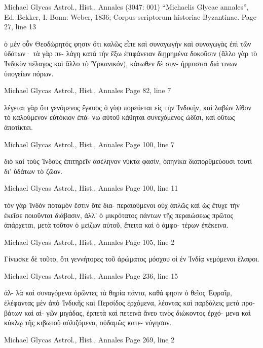 \documentclass[12pt,letterpaper,twoside,final]{memoir}
\begin{document}
\begin{greek}

Michael Glycas Astrol., Hist., Annales (3047: 001)
“Michaelis Glycae annales”, Ed. Bekker, I.
Bonn: Weber, 1836; Corpus scriptorum historiae Byzantinae.
Page 27, line 13

                ὁ μὲν οὖν Θεοδώρητός φησιν ὅτι καλῶς εἶπε 
καὶ συναγωγὴν καὶ συναγωγὰς ἐπὶ τῶν ὑδάτων· τὰ γὰρ πε-
λάγη κατὰ τὴν ἔξω ἐπιφάνειαν διῃρημένα δοκοῦσιν (ἄλλο γὰρ 
τὸ Ἰνδικὸν πέλαγος καὶ ἄλλο τὸ Ὑρκανικόν), κάτωθεν δὲ συν-
ήρμοσται διά τινων ὑπογείων πόρων. 



Michael Glycas Astrol., Hist., Annales 
Page 82, line 7

      λέγεται γὰρ ὅτι γενόμενος ἔγκυος ὁ γὺψ πορεύεται εἰς 
τὴν Ἰνδικήν, καὶ λαβὼν λίθον τὸ καλούμενον εὐτόκιον ἐπά-
νω αὐτοῦ κάθηται συνεχόμενος ὠδῖσι, καὶ οὕτως ἀποτίκτει. 



Michael Glycas Astrol., Hist., Annales 
Page 100, line 7

                                              διὸ καὶ τοὺς Ἰνδοὺς 
ἐπιτηρεῖν ἀσέληνον νύκτα φασίν, ὁπηνίκα διαπορθμεύουσι 
τουτὶ δι' ὑδάτων τὸ ζῶον. 



Michael Glycas Astrol., Hist., Annales 
Page 100, line 11

                         τὸν γὰρ Ἰνδὸν ποταμὸν ἔστιν ὅτε δια-
περαιούμενοι οὐχ ἁπλῶς καὶ ὡς ἔτυχε τὴν ἐκεῖσε ποιοῦνται 
διάβασιν, ἀλλ' ὁ μικρότατος πάντων τῆς περαιώσεως πρῶτος 
ἀπάρχεται, μετὰ τοῦτον ὁ μείζων αὐτοῦ, ἔπειτα καὶ ὁ ἀμφο-
τέρων ἐπέκεινα. 



Michael Glycas Astrol., Hist., Annales 
Page 105, line 2

Γίνωσκε δὲ τοῦτο, ὅτι γεννήτορες τοῦ ἀρώματος μόσχου 
οἱ ἐν Ἰνδίᾳ νεμόμενοι ἔλαφοι. 


Michael Glycas Astrol., Hist., Annales 
Page 236, line 15

                                                             ἀλ-
λὰ καὶ συναγόμενα ὁρῶντες τὰ θηρία πάντα, καθά φησιν ὁ 
θεῖος Ἐφραΐμ, ἐλέφαντας μὲν ἀπὸ Ἰνδικῆς καὶ Περσίδος 
ἐρχόμενα, λέοντας καὶ παρδάλεις μετὰ προβάτων καὶ αἰ-
γῶν μιγάδας, ἑρπετὰ καὶ πετεινὰ ἄνευ τινὸς διώκοντος ἐρχό-
μενα καὶ κύκλῳ τῆς κιβωτοῦ αὐλιζόμενα, οὐδαμῶς κατε-
νύγησαν. 



Michael Glycas Astrol., Hist., Annales 
Page 269, line 2


\end{greek}
\end{document}
